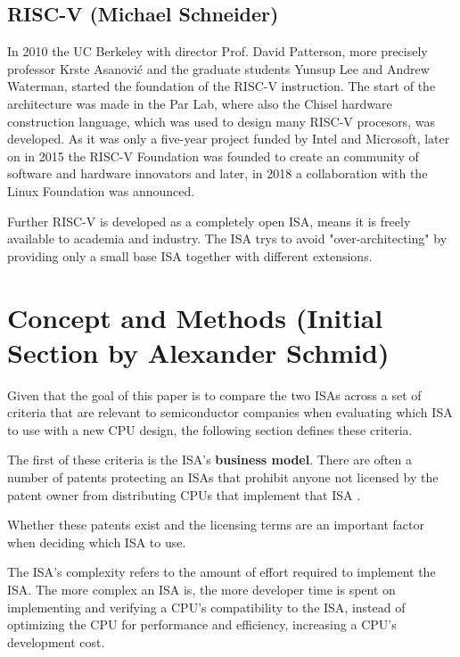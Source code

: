 \documentclass[conference]{IEEEtran}
\begin{document}
	\subsection{RISC-V (Michael Schneider)}
	In 2010 the UC Berkeley with director Prof. David Patterson, more precisely professor Krste Asanovi\'{c} and the graduate students Yunsup Lee and Andrew Waterman, started the foundation of the RISC-V instruction. The start of the architecture was made in the \gls{Par Lab}, where also the Chisel hardware construction language, which was used to design many RISC-V procesors, was developed. As it was only a five-year project funded by Intel and Microsoft, later on in 2015 the RISC-V Foundation was founded to create an community of software and hardware innovators and later, in 2018 a collaboration with the Linux Foundation was announced. \cite{International2020}

	Further RISC-V is developed as a completely open ISA, means it is freely available to academia and industry. The \gls{ISA} trys to avoid "over-architecting" by providing only a small base \gls{ISA} together with different extensions. \cite[page 1]{Waterman2017}
	
\section{Concept and Methods (Initial Section by Alexander Schmid)}
	\label{ref:concept}

Given that the goal of this paper is to compare the two \glspl{ISA}
across a set of criteria that are relevant to semiconductor companies when evaluating which \gls{ISA} to use with a new CPU design,
the following section defines these criteria.

The first of these criteria is the \gls{ISA}'s \textbf{business model}. There are often a number of patents protecting an \glspl{ISA} that prohibit anyone not licensed
by the patent owner from distributing \glspl{CPU} that implement that \gls{ISA} \cite{Tang2011}.

Whether these patents exist and the licensing terms
are an important factor when deciding which \gls{ISA} to use.

The \gls{ISA}'s complexity refers to the amount of effort required to implement the \gls{ISA}. The more complex an \gls{ISA} is, the more developer
time is spent on implementing and verifying a \gls{CPU}'s compatibility to the \gls{ISA}, instead of optimizing the \gls{CPU} for performance and efficiency,
increasing a \gls{CPU}'s development cost. \cite{Patterson1980}
\end{document}

